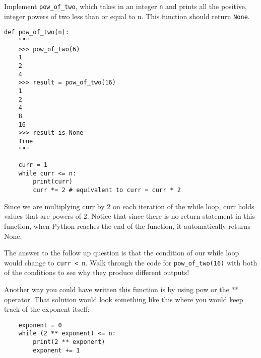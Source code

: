 \begin{blocksection}
\question Implement \lstinline$pow_of_two$, which takes in an integer \lstinline$n$ and
prints all the positive, integer powers of two less than or equal to n. This function should return \lstinline$None$.
\newline
\newline
\begin{lstlisting}
def pow_of_two(n):
    """
    >>> pow_of_two(6)
    1
    2
    4
    >>> result = pow_of_two(16)
    1
    2
    4
    8
    16
    >>> result is None
    True
    """
\end{lstlisting}
\begin{solution}[2in]
\begin{lstlisting}
    curr = 1
    while curr <= n:
        print(curr)
        curr *= 2 # equivalent to curr = curr * 2
\end{lstlisting}
Since we are multiplying curr by 2 on each iteration of the while loop, curr holds values that are powers of 2.
Notice that since there is no return statement in this function, when Python reaches the end of the function, it automatically returns None.

The answer to the follow up question is that the condition of our while loop would change to \lstinline$curr < n$.
Walk through the code for \lstinline$pow_of_two(16)$ with both of the conditions to see why they produce different outputs!

Another way you could have written this function is by using pow or the ** operator. That solution would look something like this where you would keep track of the exponent itself:

\begin{lstlisting}
    exponent = 0
    while (2 ** exponent) <= n:
        print(2 ** exponent)
        exponent += 1
\end{lstlisting}
\end{solution}
\end{blocksection}